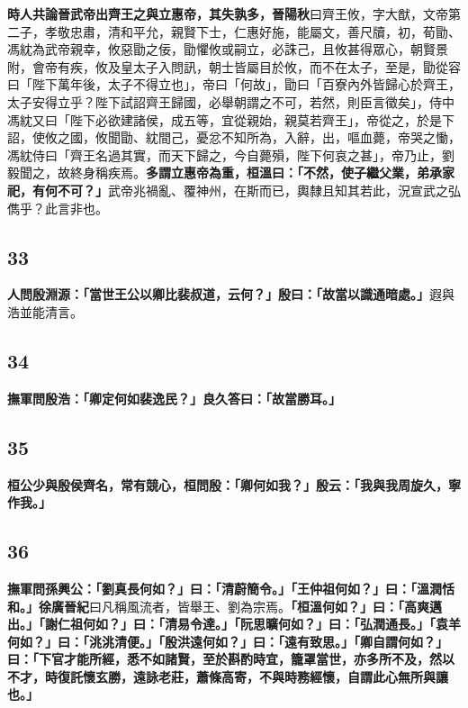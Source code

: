 \textbf{時人共論晉武帝出齊王之與立惠帝，其失孰多，}{\footnotesize \textbf{晉陽秋}曰齊王攸，字大猷，文帝第二子，孝敬忠肅，清和平允，親賢下士，仁惠好施，能屬文，善尺牘，初，荀勖、馮紞為武帝親幸，攸惡勖之佞，勖懼攸或嗣立，必誅己，且攸甚得眾心，朝賢景附，會帝有疾，攸及皇太子入問訊，朝士皆屬目於攸，而不在太子，至是，勖從容曰「陛下萬年後，太子不得立也」，帝曰「何故」，勖曰「百寮內外皆歸心於齊王，太子安得立乎？陛下試詔齊王歸國，必舉朝謂之不可，若然，則臣言徵矣」，侍中馮紞又曰「陛下必欲建諸侯，成五等，宜從親始，親莫若齊王」，帝從之，於是下詔，使攸之國，攸聞勖、紞間己，憂忿不知所為，入辭，出，嘔血薨，帝哭之慟，馮紞侍曰「齊王名過其實，而天下歸之，今自薨殞，陛下何哀之甚」，帝乃止，劉毅聞之，故終身稱疾焉。}\textbf{多謂立惠帝為重，桓溫曰：「不然，使子繼父業，弟承家祀，有何不可？」}{\footnotesize 武帝兆禍亂、覆神州，在斯而已，輿隸且知其若此，況宣武之弘儁乎？此言非也。}

\subsection*{33}

\textbf{人問殷淵源：「當世王公以卿比裴叔道，云何？」殷曰：「故當以識通暗處。」}{\footnotesize 遐與浩並能清言。}

\subsection*{34}

\textbf{撫軍問殷浩：「卿定何如裴逸民？」良久答曰：「故當勝耳。」}

\subsection*{35}

\textbf{桓公少與殷侯齊名，常有競心，桓問殷：「卿何如我？」殷云：「我與我周旋久，寧作我。」}

\subsection*{36}

\textbf{撫軍問孫興公：「劉真長何如？」曰：「清蔚簡令。」「王仲祖何如？」曰：「溫潤恬和。」}{\footnotesize \textbf{徐廣晉紀}曰凡稱風流者，皆舉王、劉為宗焉。}\textbf{「桓溫何如？」曰：「高爽邁出。」「謝仁祖何如？」曰：「清易令達。」「阮思曠何如？」曰：「弘潤通長。」「袁羊何如？」曰：「洮洮清便。」「殷洪遠何如？」曰：「遠有致思。」「卿自謂何如？」曰：「下官才能所經，悉不如諸賢，至於斟酌時宜，籠罩當世，亦多所不及，然以不才，時復託懷玄勝，遠詠老莊，蕭條高寄，不與時務經懷，自謂此心無所與讓也。」}

